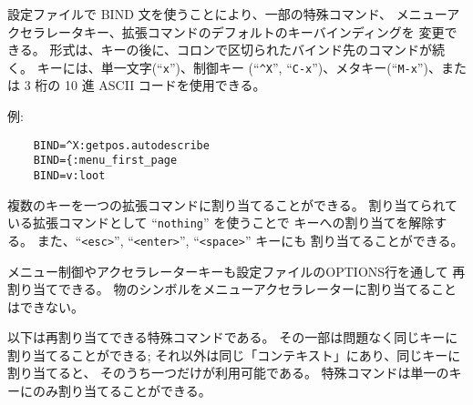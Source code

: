 設定ファイルで BIND 文を使うことにより、一部の特殊コマンド、
メニューアクセラレータキー、拡張コマンドのデフォルトのキーバインディングを
変更できる。
形式は、キーの後に、コロンで区切られたバインド先のコマンドが続く。
キーには、単一文字(``{\tt x}'')、制御キー
(``{\tt \^{}X}'', ``{\tt C-x}'')、メタキー(``{\tt M-x}'')、または 3 桁の
10 進 ASCII コードを使用できる。

例:

\begin{verbatim}
    BIND=^X:getpos.autodescribe
    BIND={:menu_first_page
    BIND=v:loot
\end{verbatim}

\blist{}
\item[\tb{拡張コマンドキー}]
複数のキーを一つの拡張コマンドに割り当てることができる。
割り当てられている拡張コマンドとして ``{\tt nothing}'' を使うことで
キーへの割り当てを解除する。
また、``{\tt <esc>}'', ``{\tt <enter>}'', ``{\tt <space>}'' キーにも
割り当てることができる。

\item[\tb{メニューアクセラレーターキー}]
メニュー制御やアクセラレーターキーも設定ファイルのOPTIONS行を通して
再割り当てできる。
物のシンボルをメニューアクセラレーターに割り当てることはできない。

\item[\tb{特殊コマンドキー}]
以下は再割り当てできる特殊コマンドである。
その一部は問題なく同じキーに割り当てることができる;
それ以外は同じ「コンテキスト」にあり、同じキーに割り当てると、
そのうち一つだけが利用可能である。
特殊コマンドは単一のキーにのみ割り当てることができる。
\elist

